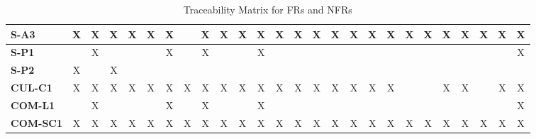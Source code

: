 \documentclass[12pt]{article}
\begin{document}
\begin{table}[H]
\begin{adjustwidth}{-1.4in}{-1in}
{\begin{tabular}{c|c|c|c|c|c|c|c|c|c|c|c|c|c|c|c|c|c|c|c|c|c|c|c|c|c|}
  \multicolumn{1}{|l|}{\textbf{S-A3}}    &       X      &       X      &       X      &       X      &       X      &       X      &              &       X      &       X      &       X      &       X      &       X      &       X      &       X      &       X      &       X      &       X      &       X      &       X      &       X      &       X      &       X      &       X      &       X      &       X       \\ \hline
  \multicolumn{1}{|l|}{\textbf{S-P1}}    &              &       X      &              &              &              &       X      &              &       X      &              &              &       X      &              &              &              &              &              &              &              &              &              &              &              &              &              &       X       \\ \hline
  \multicolumn{1}{|l|}{\textbf{S-P2}}    &       X      &              &       X      &              &              &              &              &              &              &              &              &              &              &              &              &              &              &              &              &              &              &              &              &              &               \\ \hline
  \multicolumn{1}{|l|}{\textbf{CUL-C1}}  &       X      &       X      &       X      &       X      &       X      &       X      &       X      &       X      &       X      &       X      &       X      &       X      &       X      &       X      &       X      &       X      &       X      &       X      &              &              &       X      &       X      &              &       X      &       X       \\ \hline
  \multicolumn{1}{|l|}{\textbf{COM-L1}}  &              &       X      &              &              &              &       X      &              &       X      &              &              &       X      &              &              &              &              &              &              &              &              &              &              &              &              &              &       X       \\ \hline
  \multicolumn{1}{|l|}{\textbf{COM-SC1}} &       X      &       X      &       X      &       X      &       X      &       X      &       X      &       X      &       X      &       X      &       X      &       X      &       X      &       X      &       X      &       X      &       X      &       X      &       X      &       X      &       X      &       X      &       X      &       X      &       X       \\ \hline
  \end{tabular}
  }
\caption{Traceability Matrix for FRs and NFRs}
    \label{tab:matrix-fr-nfr}
\end{adjustwidth}
\end{table}
\end{document}
